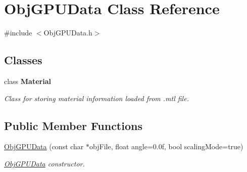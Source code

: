 \hypertarget{class_obj_g_p_u_data}{}\section{Obj\+G\+P\+U\+Data Class Reference}
\label{class_obj_g_p_u_data}


{\ttfamily \#include $<$Obj\+G\+P\+U\+Data.\+h$>$}

\subsection*{Classes}
\begin{DoxyCompactItemize}
\item 
class {\bfseries Material}
\begin{DoxyCompactList}\small\item\em Class for storing material information loaded from .mtl file. \end{DoxyCompactList}\end{DoxyCompactItemize}
\subsection*{Public Member Functions}
\begin{DoxyCompactItemize}
\item 
\hyperlink{class_obj_g_p_u_data_a1a80369702374b5547ed1094e0185819}{Obj\+G\+P\+U\+Data} (const char $\ast$obj\+File, float angle=0.\+0f, bool scaling\+Mode=true)
\begin{DoxyCompactList}\small\item\em \hyperlink{class_obj_g_p_u_data}{Obj\+G\+P\+U\+Data} constructor. \end{DoxyCompactList}\end{DoxyCompactItemize}
